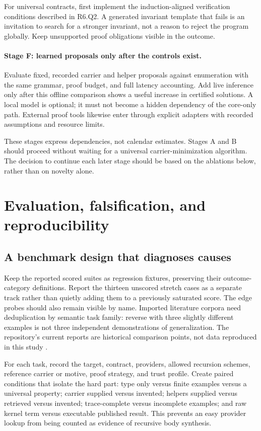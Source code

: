 For universal contracts, first implement the induction-aligned verification
conditions described in R6.Q2. A generated invariant template that fails is
an invitation to search for a stronger invariant, not a reason to reject the
program globally. Keep unsupported proof obligations visible in the outcome.

\paragraph{Stage F: learned proposals only after the controls exist.}
Evaluate fixed, recorded carrier and helper proposals against enumeration with
the same grammar, proof budget, and full latency accounting. Add live inference
only after this offline comparison shows a useful increase in certified
solutions. A local model is optional; it must not become a hidden dependency
of the core-only path. External proof tools likewise enter through explicit
adapters with recorded assumptions and resource limits.

These stages express dependencies, not calendar estimates. Stages A and B
should proceed without waiting for a universal carrier-minimization algorithm.
The decision to continue each later stage should be based on the ablations
below, rather than on novelty alone.

\section{Evaluation, falsification, and reproducibility}\label{sec:evaluation}

\subsection{A benchmark design that diagnoses causes}

Keep the reported scored suites as regression fixtures, preserving their
outcome-category definitions. Report the thirteen unscored stretch cases as a
separate track rather than quietly adding them to a previously saturated
score. The edge probes should also remain visible by name. Imported literature
corpora need deduplication by semantic task family: reverse with three slightly
different examples is not three independent demonstrations of generalization.
The repository's current reports are historical comparison points, not data
reproduced in this study \cite{proposal,implementation}.

For each task, record the target, contract, providers, allowed recursion
schemes, reference carrier or motive, proof strategy, and trust profile.
Create paired conditions that isolate the hard part: type only versus finite
examples versus a universal property; carrier supplied versus invented;
helpers supplied versus retrieved versus invented; trace-complete versus
incomplete examples; and raw kernel term versus executable published result.
This prevents an easy provider lookup from being counted as evidence of
recursive body synthesis.


